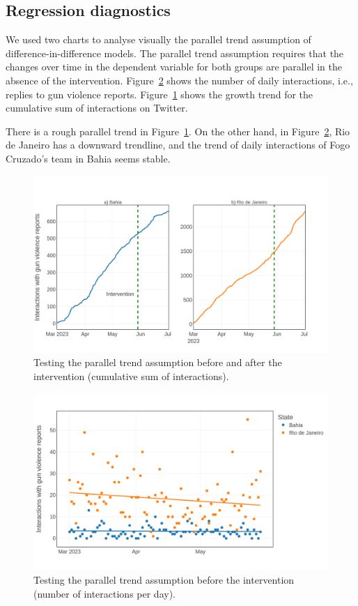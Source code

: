 \documentclass[11pt,letterpaper]{article}
\begin{document}
\subsection{Regression diagnostics}
We used two charts to analyse visually the parallel trend assumption of difference-in-difference models. The parallel trend assumption requires that the changes over time in the dependent variable for both groups are parallel in the absence of the intervention. Figure~\ref{fig:diffindiff} shows the number of daily interactions, i.e., replies to gun violence reports. Figure~\ref{fig:cumsum-diffindiff} shows the growth trend for the cumulative sum of interactions on Twitter. 

There is a rough parallel trend in Figure~\ref{fig:cumsum-diffindiff}. On the other hand, in Figure~\ref{fig:diffindiff}, Rio de Janeiro has a downward trendline, and the trend of daily interactions of Fogo Cruzado's team in Bahia seems stable. 

\begin{figure}[H]
    \centering
    \includegraphics[width=0.8\linewidth]{figs/appendix/regression/rioba-cumsum.png}
    \caption{Testing the parallel trend assumption before and after the intervention (cumulative sum of interactions).}
    \label{fig:cumsum-diffindiff}
\end{figure}

\begin{figure}[H]
    \centering
    \includegraphics[width=0.8\linewidth]{figs/appendix/regression/trendline.png}
    \caption{Testing the parallel trend assumption before the intervention (number of interactions per day).}
    \label{fig:diffindiff}
\end{figure}
\end{document}
